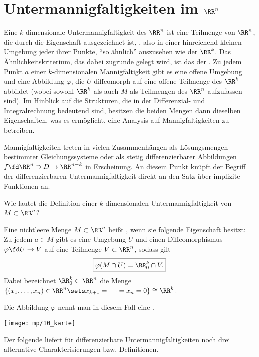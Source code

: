 \section{Untermannigfaltigkeiten im $\RR^n$}

Eine $k$-dimensionale Untermannigfaltigkeit des $\RR^n$ ist 
eine Teilmenge von $\RR^n$, die durch die Eigenschaft ausgezeichnet 
ist, , also in einer hinreichend 
kleinen Umgebung jeder ihrer Punkte, "`so ähnlich"' 
auszusehen wie der $\RR^k$. Das Ähnlichkeitskriterium, das dabei zugrunde 
gelegt wird, ist das der . Zu jedem 
Punkt $a$ einer $k$-dimensionalen Mannigfaltigkeit gibt es eine 
offene Umgebung und eine Abbildung $\varphi$, die $U$ diffeomorph auf eine 
offene Teilmenge des $\RR^k$ abbildet (wobei sowohl $\RR^k$ als auch $M$ als 
Teilmengen des $\RR^n$ aufzufassen sind). Im Hinblick 
auf die Strukturen, die in der Differenzial- und Integralrechnung  
bedeutend sind, besitzen die beiden Mengen 
dann dieselben Eigenschaften, 
was es ermöglicht, eine Analysis auf Mannigfaltigkeiten zu betreiben.

Mannigfaltigkeiten treten in vielen Zusammenhängen als Lösungsmengen 
bestimmter Gleichungssysteme oder als  
 stetig differenzierbarer 
Abbildungen $f\fd \RR^n \supset D \to \RR^{n-k}$ in Erscheinung. 
An diesem Punkt knüpft der Begriff der differenzierbaren 
Untermannigfaltigkeit direkt an den Satz über implizite Funktionen an.


\begin{frage}\label{10_mannidef}
  Wie lautet die Definition einer $k$-dimensionalen Untermannigfaltigkeit 
  von $M\subset \RR^n$?
\end{frage}

\begin{antwort}
  Eine nichtleere Menge $M\subset \RR^n$ heißt , wenn sie  
  folgende Eigenschaft besitzt: Zu jedem $a\in M$ gibt es eine 
  Umgebung $U$ und einen Diffeomorphismus $\varphi\fd U\to V$ auf 
  eine Teilmenge $V\subset\RR^n$, sodass gilt 
  \[
  \boxed{
    \varphi( M \cap U ) = \RR_0^k \cap V.
  }
  \]
  Dabei bezeichnet $\RR_0^k \subset \RR^n$ die Menge 
  $\{ (x_1,\ldots,x_n) \in \RR^n \sets x_{k+1}=\cdots = x_n=0 \} 
  \cong \RR^k$. 

  \noindent%
  Die Abbildung $\varphi$ nennt man in diesem Fall eine . 

  \begin{center}
    \texttt{[image: mp/10\_karte]}
  \end{center}

  Der folgende  liefert  
  für differenzierbare Untermannigfaltigkeiten noch drei alternative 
  Charakterisierungen bzw. Definitionen. \AntEnd
\end{antwort}

